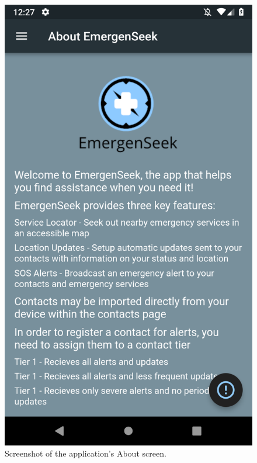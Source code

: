 \documentclass[10pt, a4paper]{article}
\begin{document}
\begin{figure}[H]
  \includegraphics[width=\linewidth]{final-diagrams/Emulator-Screenshots/Screenshot_1556126833.png}
  \caption{Screenshot of the application's About screen.}
\endminipage\hfill
{}

\end{figure}
\end{document}
